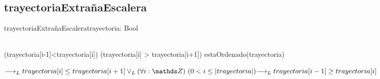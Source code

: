 \subsection{trayectoriaExtrañaEscalera}
\begin{proc}{trayectoriaExtrañaEscalera}{\In trayectoria: \TLista{\float}}{Bool}
    \requiere{\True}
\end{proc}

    {
    \implicaLuego \\
        ({trayectoria[i-1]<trayectoria[i]) \land (trayectoria[i] > trayectoria[i+1])} 
        \oLuego estaOrdenado(trayectoria)
}

  $  \implicaLuego{trayectoria[i]\leq trayectoria[i+1]} 
\\ \oLuego \paraTodo[unalinea]{i}{\ent}{0 < i \leq |trayectoria|}{\implicaLuego{trayectoria[i-1]\geq trayectoria[i]}}$
    
